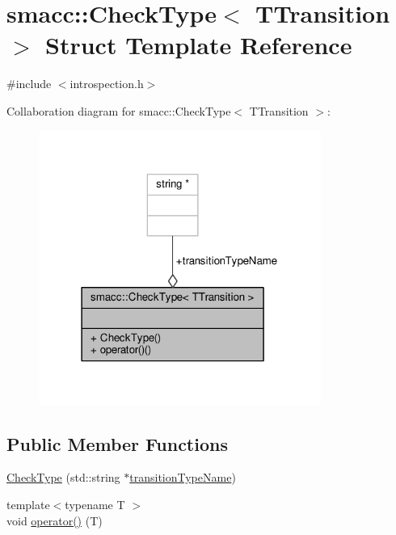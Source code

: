 \hypertarget{structsmacc_1_1CheckType}{}\section{smacc\+:\+:Check\+Type$<$ T\+Transition $>$ Struct Template Reference}
\label{structsmacc_1_1CheckType}


{\ttfamily \#include $<$introspection.\+h$>$}



Collaboration diagram for smacc\+:\+:Check\+Type$<$ T\+Transition $>$\+:
\nopagebreak
\begin{figure}[H]
\begin{center}
\leavevmode
\includegraphics[width=262pt]{structsmacc_1_1CheckType__coll__graph}
\end{center}
\end{figure}
\subsection*{Public Member Functions}
\begin{DoxyCompactItemize}
\item 
\hyperlink{structsmacc_1_1CheckType_a0123f874439e9da1c33a23cd7b33e413}{Check\+Type} (std\+::string $\ast$\hyperlink{structsmacc_1_1CheckType_a6402dc8352758d361781773dc1e8523f}{transition\+Type\+Name})
\item 
{\footnotesize template$<$typename T $>$ }\\void \hyperlink{structsmacc_1_1CheckType_aafa40f91456602c5cf5eda7c1f553f7b}{operator()} (T)
\end{DoxyCompactItemize}
